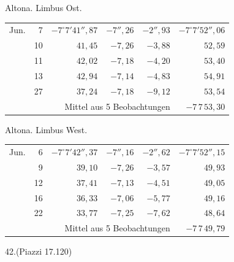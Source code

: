 \noindent\begin{minipage}[t]{.495\textwidth}\centering Altona. Limbus Ost.\par\smallskip
{\scriptsize\setlength{\tabcolsep}{1pt}\renewcommand{\arraystretch}{1.2}\begin{tabular}{lr|r|r|r|r|}
Jun.&7&$-7^\circ7'41''{,}87$&$-7''{,}26$&$-2''{,}93$&$-7^\circ7'52''{,}06$\\
&10&$41{,}45$&$-7{,}26$&$-3{,}88$&$52{,}59$\\
&11&$42{,}02$&$-7{,}18$&$-4{,}20$&$53{,}40$\\
&13&$42{,}94$&$-7{,}14$&$-4{,}83$&$54{,}91$\\
&27&$37{,}24$&$-7{,}18$&$-9{,}12$&$53{,}54$\\
\cline{6-6}\multicolumn{5}{r}{Mittel aus 5 Beobachtungen}&$-7\,7\,53{,}30$
\end{tabular}}\end{minipage}\hfill\begin{minipage}[t]{.495\textwidth}\centering Altona. Limbus West.\par\smallskip
{\scriptsize\setlength{\tabcolsep}{1pt}\renewcommand{\arraystretch}{1.2}\begin{tabular}{lr|r|r|r|r}
Jun.&6&$-7^\circ7'42''{,}37$&$-7''{,}16$&$-2''{,}62$&$-7^\circ7'52''{,}15$\\
&9&$39{,}10$&$-7{,}26$&$-3{,}57$&$49{,}93$\\
&12&$37{,}41$&$-7{,}13$&$-4{,}51$&$49{,}05$\\
&16&$36{,}33$&$-7{,}06$&$-5{,}77$&$49{,}16$\\
&22&$33{,}77$&$-7{,}25$&$-7{,}62$&$48{,}64$\\
\cline{6-6}\multicolumn{5}{r}{Mittel aus 5 Beobachtungen}&$-7\,7\,49{,}79$
\end{tabular}}\end{minipage}
\par\vspace{4mm}
\begin{center}42.\quad (Piazzi 17.120)\end{center}

